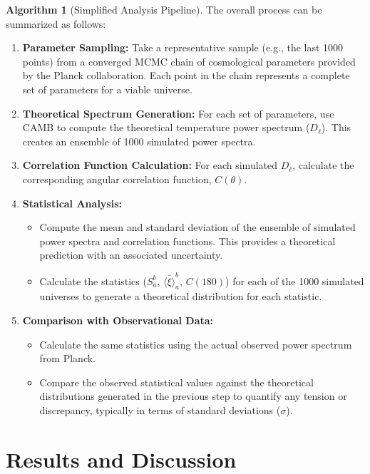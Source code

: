 \documentclass{article}
\theoremstyle{definition}
\newtheorem{algorithm}{Algorithm}[section]
\begin{document}
\begin{algorithm}[Simplified Analysis Pipeline]
The overall process can be summarized as follows:
\begin{enumerate}
    \item \textbf{Parameter Sampling:} Take a representative sample (e.g., the last 1000 points) from a converged MCMC chain of cosmological parameters provided by the Planck collaboration. Each point in the chain represents a complete set of parameters for a viable universe.
    \item \textbf{Theoretical Spectrum Generation:} For each set of parameters, use CAMB to compute the theoretical temperature power spectrum ($D_\ell$). This creates an ensemble of 1000 simulated power spectra.
    \item \textbf{Correlation Function Calculation:} For each simulated $D_\ell$, calculate the corresponding angular correlation function, $C(\theta)$.
    \item \textbf{Statistical Analysis:}
    \begin{itemize}
        \item Compute the mean and standard deviation of the ensemble of simulated power spectra and correlation functions. This provides a theoretical prediction with an associated uncertainty.
        \item Calculate the statistics ($S_a^b$, $\bar{\langle\xi\rangle}_a^b$, $C(180)$) for each of the 1000 simulated universes to generate a theoretical distribution for each statistic.
    \end{itemize}
    \item \textbf{Comparison with Observational Data:}
    \begin{itemize}
        \item Calculate the same statistics using the actual observed power spectrum from Planck.
        \item Compare the observed statistical values against the theoretical distributions generated in the previous step to quantify any tension or discrepancy, typically in terms of standard deviations ($\sigma$).
    \end{itemize}
\end{enumerate}
\end{algorithm}

\section{Results and Discussion}
\end{document}
